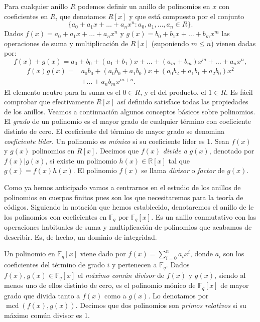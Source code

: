 Para cualquier anillo \(R\) podemos definir un anillo de polinomios en \(x\) con coeficientes en \(R\), que denotamos \(R[x]\) y que está compuesto por el conjunto
\[
  \{a_0 + a_1x + \dots + a_nx^n : a_0, a_1, \dots, a_n \in R\}.
\]
Dados \(f(x) = a_0 + a_1x + \dots + a_nx^n\) y \(g(x) = b_0 + b_1x + \dots + b_mx^m\) las operaciones de suma y multiplicación de \(R[x]\) (suponiendo \(m \leq n\)) vienen dadas por:
\[
  f(x) + g(x) = a_0 + b_0 + (a_1 + b_1)x + \dots + (a_m + b_m)x^m + \dots + a_nx^n,
\]
\begin{align*}
  f(x)g(x) = &a_0b_0 + (a_0b_0 + a_1b_0)x + (a_0b_2 + a_1b_1 + a_2b_0)x^2\\
    &+ \dots + a_nb_mx^{m+n}.
\end{align*}
El elemento neutro para la suma es el \(0 \in R\), y el del producto, el \(1 \in R\).
Es fácil comprobar que efectivamente \(R[x]\) así definido satisface todas las propiedades de los anillos.
Veamos a continuación algunos conceptos básicos sobre polinomios.
El \textit{grado} de un polinomio es el mayor grado de cualquier término con coeficiente distinto de cero.
El coeficiente del término de mayor grado se denomina \textit{coeficiente líder}.
Un polinomio es \textit{mónico} si su coeficiente líder es 1.
Sean \(f(x)\) y \(g(x)\) polinomios en \(R[x]\).
Decimos que \(f(x)\) \textit{divide a} \(g(x)\), denotado por \(f(x) | g(x)\), si existe un polinomio \(h(x) \in \mathbb R[x]\) tal que \(g(x) = f(x)h(x)\).
El polinomio \(f(x)\) se llama \textit{divisor} o \textit{factor} de \(g(x)\).

Como ya hemos anticipado vamos a centrarnos en el estudio de los anillos de polinomios en cuerpos finitos pues son los que necesitaremos para la teoría de códigos.
Siguiendo la notación que hemos establecido, denotaremos el anillo de le los polinomios con coeficientes en \(\mathbb F_q\) por \(\mathbb F_q[x]\).
Es un anillo conmutativo con las operaciones habituales de suma y multiplicación de polinomios que acabamos de describir.
Es, de hecho, un dominio de integridad.

Un polinomio en \(\mathbb F_q[x]\) viene dado por \(f(x) = \sum_{i=0}^n a_ix^i\), donde \(a_i\) son los coeficientes del término de grado \(i\) y pertenecen a \(\mathbb F_q\).
Dados \(f(x), g(x) \in \mathbb F_q[x]\) el \textit{máximo común divisor} de \(f(x)\) y \(g(x)\), siendo al menos uno de ellos distinto de cero, es el polinomio mónico de \(\mathbb F_q[x]\) de mayor grado que divida tanto a \(f(x)\) como a \(g(x)\).
Lo denotamos por \(\operatorname{mcd}(f(x), g(x))\).
Decimos que dos polinomios son \textit{primos relativos} si su máximo común divisor es 1.

